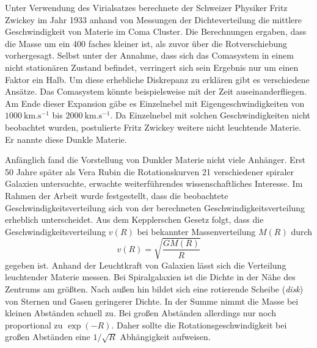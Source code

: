 Unter Verwendung des Virialsatzes berechnete der Schweizer Physiker Fritz Zwickey im Jahr 1933 anhand von Messungen der Dichteverteilung die mittlere Geschwindigkeit von Materie im Coma Cluster.
Die Berechnungen ergaben, dass die Masse um ein 400 faches kleiner ist, als zuvor über die Rotverschiebung vorhergesagt.
Selbst unter der Annahme, dass sich das Comasystem in einem nicht stationären Zustand befindet, verringert sich sein Ergebnis nur um einen Faktor ein Halb.
Um diese erhebliche Diskrepanz zu erklären gibt es verschiedene Ansätze.
Das Comasystem könnte beispielsweise mit der Zeit auseinanderfliegen.
Am Ende dieser Expansion gäbe es Einzelnebel mit Eigengeschwindigkeiten von $\SI{1000}{\kilo\meter.\second^{-1}}$ bis $\SI{2000}{\kilo\meter.\second^{-1}}$.
Da Einzelnebel mit solchen Geschwindigkeiten nicht beobachtet wurden, postulierte Fritz Zwickey weitere nicht leuchtende Materie.
Er nannte diese Dunkle Materie.\cite{zwicky}

Anfänglich fand die Vorstellung von Dunkler Materie nicht viele Anhänger.
Erst 50 Jahre später als Vera Rubin die Rotationskurven 21 verschiedener spiraler Galaxien untersuchte, erwachte weiterführendes wissenschaftliches Interesse.
Im Rahmen der Arbeit wurde festgestellt, dass die beobachtete Geschwindigkeitsverteilung sich von der berechneten Geschwindigkeitsverteilung erheblich unterscheidet.
Aus dem Kepplerschen Gesetz folgt, dass die Geschwindigkeitsverteilung $v(R)$ bei bekannter Massenverteilung $M(R)$ durch
\begin{equation}
v(R) = \sqrt{\frac{GM(R)}{R}}
\label{eq:Keppler}
\end{equation}
gegeben ist.
Anhand der Leuchtkraft von Galaxien lässt sich die Verteilung leuchtender Materie messen.
Bei Spiralgalaxien ist die Dichte in der Nähe des Zentrums am größten.
Nach außen hin bildet sich eine rotierende Scheibe (\textit{disk}) von Sternen und Gasen geringerer Dichte.
In der Summe nimmt die Masse bei kleinen Abständen schnell zu.
Bei großen Abständen allerdings nur noch proportional zu $\exp(-R)$.
Daher sollte die Rotationsgeschwindigkeit bei großen Abständen eine $1/\sqrt{R}$ Abhängigkeit aufweisen.

